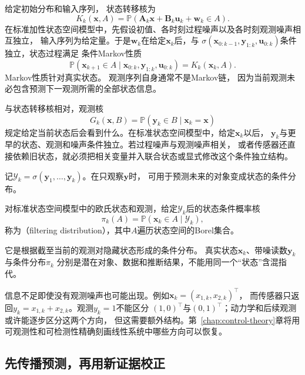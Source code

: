 给定初始分布和输入序列， 状态转移核为
\[
	K_{k}(\bm{x},A) = \mathbb{P}\!\left( \bm{A}_{k}\bm{x}+\bm{B}_{k}\bm{u}_{k}+\bm{w}
	_{k}\in A \right).
\]
在标准加性状态空间模型中，先假设初值、各时刻过程噪声以及各时刻观测噪声相互独立，
输入序列为给定量。于是$\bm{w}_k$在给定$\bm{x}_k$后，与
$\sigma(\bm{x}_{0:k-1},\bm{y}_{1:k},\bm{u}_{0:k})$条件独立，状态过程满足
条件Markov性质
\[
	\mathbb{P}( \bm{x}_{k+1}\in A \mid \bm{x}_{0:k},\bm{y}_{1:k},\bm{u}_{0:k}) = K_{k}
	(\bm{x}_{k},A).
\]
Markov性质针对真实状态。 观测序列自身通常不是Markov链， 因为当前观测未必包含预测下一观测所需的全部状态信息。

与状态转移核相对，观测核
\[
	G_k(\bm{x},B)
	=\mathbb{P}(\bm{y}_k\in B\mid \bm{x}_k=\bm{x})
\]
规定给定当前状态后会看到什么。在标准状态空间模型中，给定$\bm{x}_k$以后，
$\bm{y}_k$与更早的状态、观测和噪声条件独立。若过程噪声与观测噪声相关，
或者传感器还直接依赖旧状态，就必须把相关变量并入联合状态或显式修改这个条件独立结构。

记$\mathcal{Y}_{k}=\sigma(\bm{y}_{1},\ldots,\bm{y}_{k})$。在只观察$\bm{y}$时，
可用于预测未来的对象变成状态的条件分布。
\begin{definition}[滤波分布]
\label{def:dynamical-filtering-distribution}
对标准状态空间模型中的欧氏状态和观测，给定$\mathcal Y_k$后的状态条件概率核
\begin{equation}
	\pi_{k}(A) = \mathbb{P}(\bm{x}_{k}\in A\mid\mathcal{Y}_{k}), \label{eq:dynamical-filtering-distribution}
\end{equation}
称为（filtering distribution），其中$A$遍历状态空间的Borel集合。
\end{definition}
它是根据截至当前的观测对隐藏状态形成的条件分布。
真实状态$\bm{x}_{k}$、带噪读数$\bm{y}_{k}$与条件分布$\pi_{k}$
分别是潜在对象、数据和推断结果，不能用同一个“状态”含混指代。

信息不足即使没有观测噪声也可能出现。例如$\bm{x}_k=(x_{1,k},x_{2,k})^{\top}$，
而传感器只返回$y_k=x_{1,k}+x_{2,k}$。观测$y_k=1$不能区分
$(1,0)^{\top}$与$(0,1)^{\top}$；动力学和后续观测或许能逐步区分这两个方向，
但这需要额外结构。第~\ref{chap:control-theory}章将用可观测性和可检测性精确刻画线性系统中哪些方向可以恢复。

\subsection{先传播预测，再用新证据校正}

